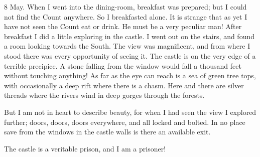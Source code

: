 \begin{diary}{8 May.}
When I went into the dining-room, breakfast was prepared; but I could not find the Count anywhere. So I breakfasted alone. It is strange that as yet I have not seen the Count eat or drink. He must be a very peculiar man! After breakfast I did a little exploring in the castle. I went out on the stairs, and found a room looking towards the South. The view was magnificent, and from where I stood there was every opportunity of seeing it. The castle is on the very edge of a terrible precipice. A stone falling from the window would fall a thousand feet without touching anything! As far as the eye can reach is a sea of green tree tops, with occasionally a deep rift where there is a chasm. Here and there are silver threads where the rivers wind in deep gorges through the forests.

But I am not in heart to describe beauty, for when I had seen the view I explored further; doors, doors, doors everywhere, and all locked and bolted. In no place save from the windows in the castle walls is there an available exit.

The castle is a veritable prison, and I am a prisoner!
\end{diary}
